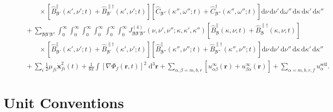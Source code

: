 \documentclass{article}
\begin{document}
\begin{equation}
\begin{split}
&\qquad\qquad\times\left[\hat{B}_{\bm{\beta}'}^\parallel(\kappa',\nu';t) + \hat{B}_{\bm{\beta}'}^{\parallel\dagger}(\kappa',\nu';t)\right]\left[\hat{C}_{\bm{\beta}''}(\kappa'',\omega'';t) + \hat{C}_{\bm{\beta}''}^\dagger(\kappa'',\omega'';t)\right]\mathrm{d}\nu\,\mathrm{d}\nu'\,\mathrm{d}\omega''\,\mathrm{d}\kappa\,\mathrm{d}\kappa'\,\mathrm{d}\kappa''\\
&\qquad + \sum_{\bm{\beta}\bm{\beta}'\bm{\beta}''}\int_0^\infty\int_0^\infty\int_0^\infty\int_0^\infty\int_0^\infty\int_0^\infty J_{\bm{\beta}\bm{\beta}'\bm{\beta}''}^{(4)}(\nu,\nu',\nu'';\kappa,\kappa',\kappa'')\left[\hat{B}_{\bm{\beta}}^\parallel(\kappa,\nu;t) + \hat{B}_{\bm{\beta}}^{\parallel\dagger}(\kappa,\nu;t)\right]\\
&\qquad\qquad\times\left[\hat{B}_{\bm{\beta}'}^\parallel(\kappa',\nu';t) + \hat{B}_{\bm{\beta}'}^{\parallel\dagger}(\kappa',\nu';t)\right]\left[\hat{B}_{\bm{\beta}''}^\parallel(\kappa'',\nu'';t) + \hat{B}_{\bm{\beta}''}^{\parallel\dagger}(\kappa'',\nu'';t)\right]\mathrm{d}\nu\,\mathrm{d}\nu'\,\mathrm{d}\nu''\,\mathrm{d}\kappa\,\mathrm{d}\kappa'\,\mathrm{d}\kappa''\\[0.5em]
&\qquad + \sum_i\frac{1}{2}\mu_{fi}\dot{\mathbf{x}}_{fi}^2(t) + \frac{1}{8\pi}\int\left[\nabla\Phi_f(\mathbf{r},t)\right]^2\;\mathrm{d}^3\mathbf{r} + \sum_{\alpha,\beta = m,b,r}\left[u_{\alpha\beta}^\infty(\mathbf{r}) + u_{\beta\alpha}^\infty(\mathbf{r})\right] + \sum_{\alpha = m,b,r,f}u_\alpha^\mathrm{self}.
\end{split}
\end{equation}




























\newpage
\appendix
{}

\section{Unit Conventions}\label{app:unitConventions}
\end{document}
